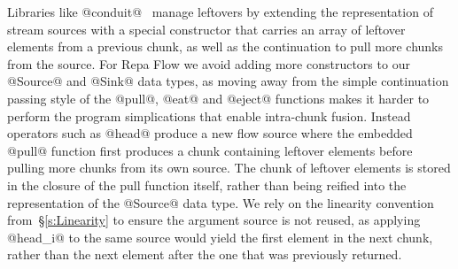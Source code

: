 Libraries like @conduit@~\cite{hackage:conduit} manage leftovers by extending the representation of stream sources with a special constructor that carries an array of leftover elements from a previous chunk, as well as the continuation to pull more chunks from the source. For Repa Flow we avoid adding more constructors to our @Source@ and @Sink@ data types, as moving away from the simple continuation passing style of the @pull@, @eat@ and @eject@ functions makes it harder to perform the program simplications that enable intra-chunk fusion. Instead operators such as @head@ produce a new flow source where the embedded @pull@ function first produces a chunk containing leftover elements before pulling more chunks from its own source. The chunk of leftover elements is stored in the closure of the pull function itself, rather than being reified into the representation of the @Source@ data type. We rely on the linearity convention from~\S\ref{s:Linearity} to ensure the argument source is not reused, as applying @head_i@ to the same source would yield the first element in the next chunk, rather than the next element after the one that was previously returned.

